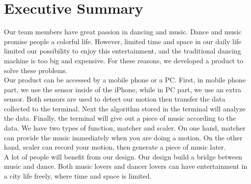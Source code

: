 \newpage
\section{Executive Summary}

Our team members have great passion in dancing and music. Dance and music promise people a colorful life. However, limited time and space in our daily life limited our possibility to enjoy this entertainment, and the traditional dancing machine is too big and expensive. For these reasons, we developed a product to solve these problems. \\
Our product can be accessed by a mobile phone or a PC. First, in mobile phone part, we use the sensor inside of the iPhone, while in PC part, we use an extra sensor. Both sensors are used to detect our motion then transfer the data collected to the terminal. Next the algorithm stored in the terminal will analyze the data. Finally, the terminal will give out a piece of music according to the data. We have two types of function, matcher and scaler. On one hand, matcher can provide the music immediately when you are doing a motion. On the other hand, scaler can record your motion, then generate a piece of music later. \\
A lot of people will benefit from our design. Our design build a bridge between music and dance. Both music lovers and dancer lovers can have entertainment in a city life freely, where time and space is limited. 
